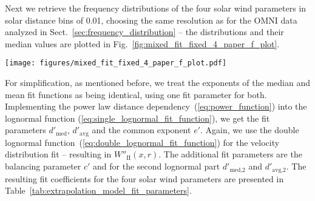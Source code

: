 \documentclass[]{aa}
\begin{document}
        Next we retrieve the frequency distributions of the four solar wind parameters in solar distance bins of \SI{0.01}{\au}, choosing the same resolution as for the OMNI data analyzed in Sect.~\ref{sec:frequency_distribution} -- the distributions and their median values are plotted in Fig.~\ref{fig:mixed_fit_fixed_4_paper_f_plot}.
        \begin{figure*}
                \texttt{[image: figures/mixed\_fit\_fixed\_4\_paper\_f\_plot.pdf]}
                \caption{Frequency distributions of the four solar wind parameters with respect to solar distance. Plotted are the binned Helios data and the power law lognormal fit models with their median values (white lines). The double lognormal model is used for the velocity, its slow and fast parts are indicated by dotted lines.}
                \label{fig:mixed_fit_fixed_4_paper_f_plot}
        \end{figure*}
        For simplification, as mentioned before, we treat the exponents of the median and mean fit functions as being identical, using one fit parameter for both. Implementing the power law distance dependency~(\ref{eq:power_function}) into the lognormal function (\ref{eq:single_lognormal_fit_function}), we get the fit parameters $d'_\text{med}$, $d'_\text{avg}$ and the common exponent $e'$. Again, we use the double lognormal function~(\ref{eq:double_lognormal_fit_function}) for the velocity distribution fit -- resulting in $W''_\text{II}(x,r)$. The additional fit parameters are the balancing parameter $c'$ and for the second lognormal part $d'_\text{med,2}$ and $d'_\text{avg,2}$. The resulting fit coefficients for the four solar wind parameters are presented in Table~\ref{tab:extrapolation_model_fit_parameters}.
\end{document}
